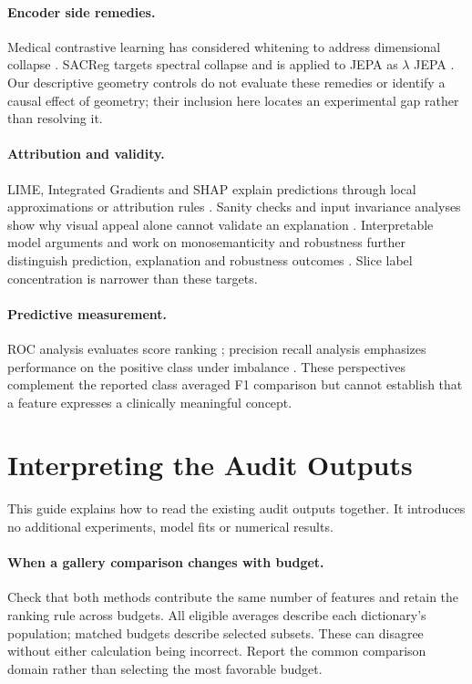 \documentclass[letterpaper]{article}
\begin{document}
\paragraph{Encoder side remedies.}
Medical contrastive learning has considered whitening to address dimensional collapse \cite{hassanpour2024collapse}. SACReg targets spectral collapse and is applied to JEPA as $\lambda$ JEPA \cite{demirel2026sacreg}. Our descriptive geometry controls do not evaluate these remedies or identify a causal effect of geometry; their inclusion here locates an experimental gap rather than resolving it.

\paragraph{Attribution and validity.}
LIME, Integrated Gradients and SHAP explain predictions through local approximations or attribution rules \cite{ribeiro2016lime,sundararajan2017axiomatic,lundberg2017shap}. Sanity checks and input invariance analyses show why visual appeal alone cannot validate an explanation \cite{adebayo2018sanity,kindermans2017reliability}. Interpretable model arguments and work on monosemanticity and robustness further distinguish prediction, explanation and robustness outcomes \cite{rudin2019interpretable,zhang2025beyond}. Slice label concentration is narrower than these targets.

\paragraph{Predictive measurement.}
ROC analysis evaluates score ranking \cite{fawcett2006roc}; precision recall analysis emphasizes performance on the positive class under imbalance \cite{saito2015precision}. These perspectives complement the reported class averaged F1 comparison but cannot establish that a feature expresses a clinically meaningful concept.

\section{Interpreting the Audit Outputs}
This guide explains how to read the existing audit outputs together. It introduces no additional experiments, model fits or numerical results.

\paragraph{When a gallery comparison changes with budget.}
Check that both methods contribute the same number of features and retain the ranking rule across budgets. All eligible averages describe each dictionary's population; matched budgets describe selected subsets. These can disagree without either calculation being incorrect. Report the common comparison domain rather than selecting the most favorable budget.
\end{document}
